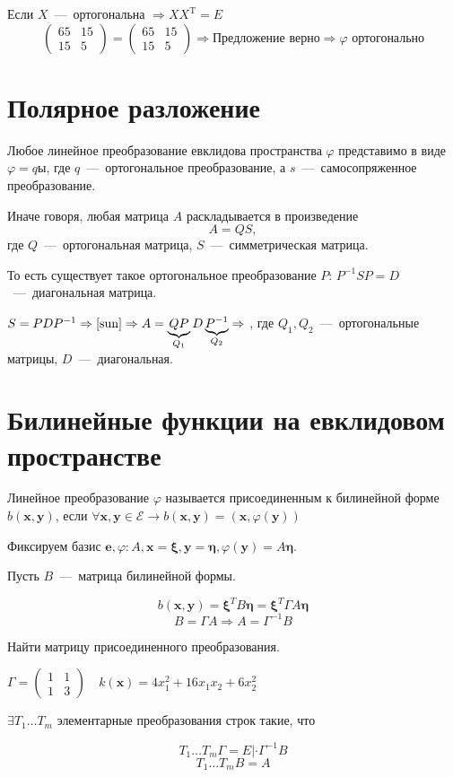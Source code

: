 Если $X$~---~ортогональна $\Rightarrow XX^{\text{T}}=E$
$$\left(\begin{array}{rr}
    65 & 15 \\
     15&5
\end{array}\right)=\left(\begin{array}{rr}
    65 & 15 \\
     15&5
\end{array}\right) \Rightarrow \text{Предложение верно} \Rightarrow \varphi \text{ ортогонально}$$

\section{Полярное разложение}

\begin{theorem}
Любое линейное преобразование евклидова пространства $\varphi$ представимо в виде $\varphi=qы$, где $q$~---~ортогональное преобразование, а $s$~---~самосопряженное преобразование.
\end{theorem}
Иначе говоря, любая матрица $A$ раскладывается в произведение
\begin{equation}
A=QS,\tag{\sun}
\label{sun}
\end{equation}
где $Q$~---~ортогональная матрица, $S$~---~симметрическая матрица.

То есть существует такое ортогональное преобразование $P: \, P^{-1}SP=D$~---~диагональная матрица.

$S=PDP^{-1} \Rightarrow \eqref{sun} \Rightarrow A=\underbrace{QP}_{Q_1}D\underbrace{P^{-1}}_{Q_2} \Rightarrow$ , где $Q_1,Q_2$~---~ортогональные матрицы, $D$~---~диагональная.
\section{Билинейные функции на евклидовом пространстве}
\begin{definition}
Линейное преобразование $\varphi$ называется присоединенным к билинейной форме $b(\textbf{x}, \textbf{y})$, если $\forall \textbf{x}, \textbf{y} \in \mathcal{E} \rightarrow b(\textbf{x}, \textbf{y})=(\textbf{x}, \varphi(\textbf{y}))$
\end{definition}
Фиксируем базис $\textbf{e}, \varphi: A, \textbf{x}=\bm\xi, \textbf{y}=\bm\eta, \varphi(\textbf{y})=A\bm\eta.$

Пусть $B$~---~матрица билинейной формы.

$$b(\textbf{x}, \textbf{y}) = \bm\xi^T B\bm\eta=\bm\xi^T \Gamma A \bm\eta$$
$$\boxed{B = \Gamma A}\Rightarrow A=\Gamma^{-1}B$$

\begin{prim}
Найти матрицу присоединенного преобразования.

$\Gamma=\left(\begin{array}{rr}
    1 & 1 \\
     1&3
\end{array}\right) \quad k(\textbf{x})=4x_1^2+16x_1x_2+6x_2^2$
\end{prim}
$\exists T_1\dots T_m$ элементарные преобразования строк такие, что

$$T_1\dots T_m \Gamma=E | \cdot \Gamma^{-1}B$$
$$T_1\dots T_mB=A$$
